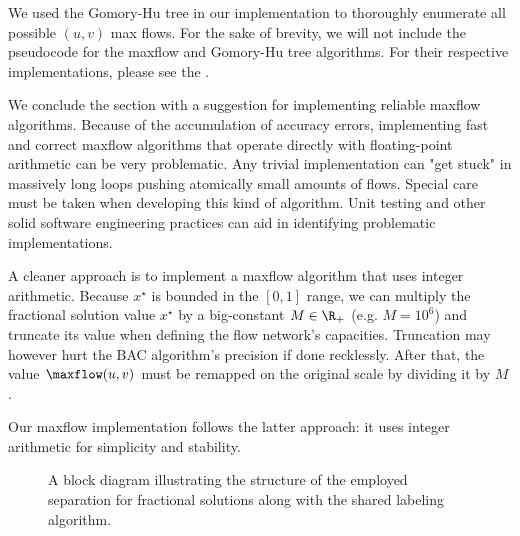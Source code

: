 We used the Gomory-Hu tree in our implementation to thoroughly enumerate all possible $(u, v)$ max flows.
For the sake of brevity, we will not include the pseudocode for the maxflow and Gomory-Hu tree algorithms.
For their respective implementations,
please see the .

\medskip

We conclude the section with a suggestion for implementing reliable maxflow algorithms.
Because of the accumulation of accuracy errors,
implementing fast and correct maxflow algorithms
that operate directly with floating-point arithmetic can be very problematic.
Any trivial implementation can "get stuck" in massively long loops
pushing atomically small amounts of flows.
Special care must be taken when developing this kind of algorithm.
Unit testing and other solid software engineering practices
can aid in identifying problematic implementations.

A cleaner approach is to implement a maxflow algorithm that uses integer arithmetic.
Because $x^\star$ is bounded in the $[0, 1]$ range,
we can multiply the fractional solution value $x^\star$ by a big-constant $M \in \R_{+}$ (e.g. $M = 10^6$)
and truncate its value when defining the flow network's capacities.
Truncation may however hurt the BAC algorithm's precision if done recklessly.
After that, the value $\maxflow(u, v)$ must be remapped on the original scale by dividing it by $M$.

Our maxflow implementation follows the latter approach: it uses integer arithmetic
for simplicity and stability.

\begin{figure}[ht]
	\centering
	\caption{
		A block diagram illustrating the structure
		of the employed separation for fractional solutions along with the shared labeling algorithm.
	}
	\label{fig:fractional-separation-block-diagram}
\end{figure}

